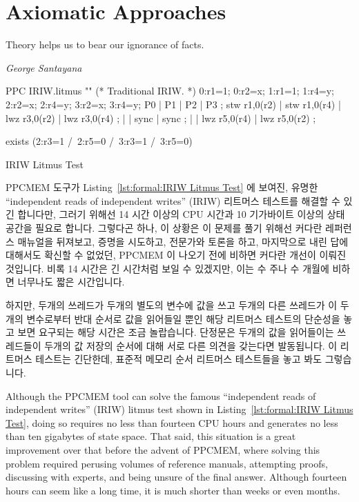 
\section{Axiomatic Approaches}
\label{sec:formal:Axiomatic Approaches}
%
\epigraph{Theory helps us to bear our ignorance of facts.}
	{\emph{George Santayana}}

\begin{listing}[tb]
\begin{linelabel}
\begin{VerbatimL}[commandchars=\%\@\$]
PPC IRIW.litmus
""
(* Traditional IRIW. *)
{
0:r1=1; 0:r2=x;
1:r1=1;         1:r4=y;
        2:r2=x; 2:r4=y;
        3:r2=x; 3:r4=y;
}
P0           | P1           | P2           | P3           ;
stw r1,0(r2) | stw r1,0(r4) | lwz r3,0(r2) | lwz r3,0(r4) ;
             |              | sync         | sync         ;
             |              | lwz r5,0(r4) | lwz r5,0(r2) ;

exists
(2:r3=1 /\ 2:r5=0 /\ 3:r3=1 /\ 3:r5=0)
\end{VerbatimL}
\end{linelabel}
\caption{IRIW Litmus Test}
\label{lst:formal:IRIW Litmus Test}
\end{listing}

PPCMEM 도구가
Listing~\ref{lst:formal:IRIW Litmus Test} 에 보여진,
유명한 ``independent reads of independent writes'' (IRIW) 리트머스 테스트를
해결할 수 있긴 합니다만, 그러기 위해선 14 시간 이상의 CPU 시간과 10 기가바이트
이상의 상태공간을 필요로 합니다.
그렇다곤 하나, 이 상황은 이 문제를 풀기 위해선 커다란 레퍼런스 매뉴얼을
뒤져보고, 증명을 시도하고, 전문가와 토론을 하고, 마지막으로 내린 답에 대해서도
확신할 수 없었던, PPCMEM 이 나오기 전에 비하면 커다란 개선이 이뤄진 것입니다.
비록 14 시간은 긴 시간처럼 보일 수 있겠지만, 이는 수 주나 수 개월에 비하면
너무나도 짧은 시간입니다.

하지만, 두개의 쓰레드가 두개의 별도의 변수에 값을 쓰고 두개의 다른 쓰레드가 이
두개의 변수로부터 반대 순서로 값을 읽어들일 뿐인 해당 리트머스 테스트의
단순성을 놓고 보면 요구되는 해당 시간은 조금 놀랍습니다.
단정문은 두개의 값을 읽어들이는 쓰레드들이 두개의 값 저장의 순서에 대해 서로
다른 의견을 갖는다면 발동됩니다.
이 리트머스 테스트는 긴단한데, 표준적 메모리 순서 리트머스 테스트들을 놓고 봐도
그렇습니다.
\iffalse

Although the PPCMEM tool can solve the famous ``independent reads of
independent writes'' (IRIW) litmus test shown in
Listing~\ref{lst:formal:IRIW Litmus Test}, doing so requires no less than
fourteen CPU hours and generates no less than ten gigabytes of state space.
That said, this situation is a great improvement over that before the advent
of PPCMEM, where solving this problem required perusing volumes of
reference manuals, attempting proofs, discussing with experts, and
being unsure of the final answer.
Although fourteen hours can seem like a long time, it is much shorter
than weeks or even months.

